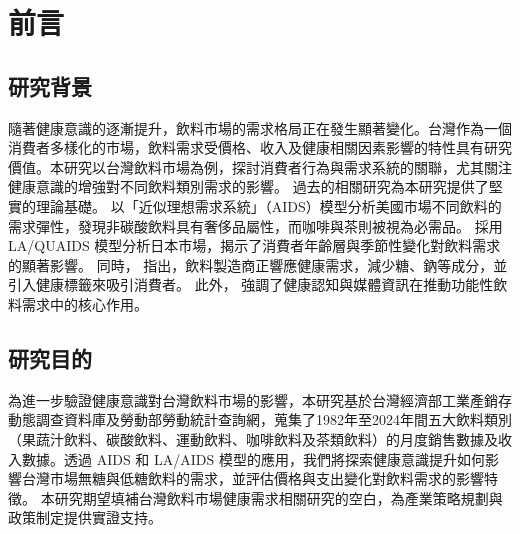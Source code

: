 \section{前言}

\subsection{研究背景}

隨著健康意識的逐漸提升，飲料市場的需求格局正在發生顯著變化。台灣作為一個消費者多樣化的市場，飲料需求受價格、收入及健康相關因素影響的特性具有研究價值。本研究以台灣飲料市場為例，探討消費者行為與需求系統的關聯，尤其關注健康意識的增強對不同飲料類別需求的影響。
過去的相關研究為本研究提供了堅實的理論基礎。\citet{RN2} 以「近似理想需求系統」（AIDS）模型分析美國市場不同飲料的需求彈性，發現非碳酸飲料具有奢侈品屬性，而咖啡與茶則被視為必需品。
\citet{RN1} 採用 LA/QUAIDS 模型分析日本市場，揭示了消費者年齡層與季節性變化對飲料需求的顯著影響。
同時，\citet{RN9} 指出，飲料製造商正響應健康需求，減少糖、鈉等成分，並引入健康標籤來吸引消費者。
此外，\citet{RN15} 強調了健康認知與媒體資訊在推動功能性飲料需求中的核心作用。

\subsection{研究目的}

為進一步驗證健康意識對台灣飲料市場的影響，本研究基於台灣經濟部工業產銷存動態調查資料庫及勞動部勞動統計查詢網，蒐集了1982年至2024年間五大飲料類別（果蔬汁飲料、碳酸飲料、運動飲料、咖啡飲料及茶類飲料）的月度銷售數據及收入數據。透過 AIDS 和 LA/AIDS 模型的應用，我們將探索健康意識提升如何影響台灣市場無糖與低糖飲料的需求，並評估價格與支出變化對飲料需求的影響特徵。
本研究期望填補台灣飲料市場健康需求相關研究的空白，為產業策略規劃與政策制定提供實證支持。